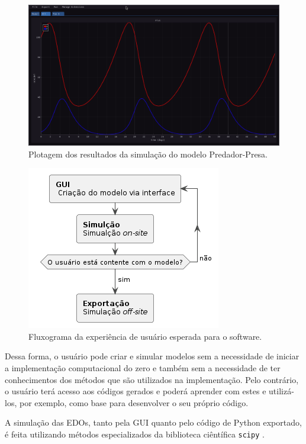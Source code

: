 \documentclass[
	12pt,				%
	openright,			%
	oneside,			%
	a4paper,			%
	main=brazil,
	english,			%
	]{ufsj-abntex2}
\begin{document}
\begin{figure}[h]
    \centering
    \includegraphics[scale=0.35]{imgs/ode-designer/grafico-all.png} 
    \caption{Plotagem dos resultados da simulação do modelo Predador-Presa.}
    \label{fig:gui-grafico-all}
\end{figure}

\begin{figure}[h]
    \centering
    \includegraphics[scale=1]{diagrams/img/fluxograma-exp.png}
    \caption{Fluxograma da experiência de usuário esperada para o software.}
    \label{fig::experiencia_usuario}
\end{figure}

Dessa forma, o usuário pode criar e simular modelos sem a necessidade de iniciar a implementação computacional do zero e também sem a necessidade de ter conhecimentos dos métodos que são utilizados na implementação. Pelo contrário, o usuário terá acesso aos códigos gerados e poderá aprender com estes e utilizá-los, por exemplo, como base para desenvolver o seu próprio código. 

A simulação das EDOs, tanto pela GUI quanto pelo código de Python exportado, é feita utilizando métodos especializados da biblioteca ciêntífica \texttt{scipy} \cite{scipy}. %
\end{document}
